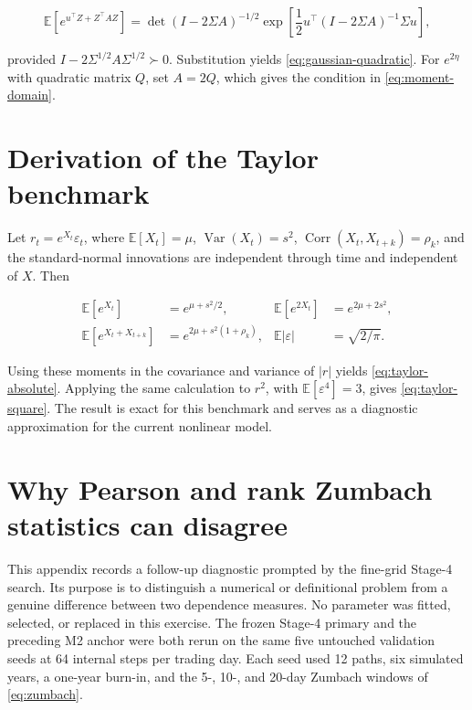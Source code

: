 \documentclass[11pt,a4paper]{article}
\newcommand{\E}{\mathbb{E}}
\newcommand{\Var}{\operatorname{Var}}
\newcommand{\Corr}{\operatorname{Corr}}
\begin{document}
\begin{equation}
\E\!\left[e^{u^\top Z+Z^\top AZ}\right]
=\det(I-2\Sigma A)^{-1/2}
\exp\!\left[
\frac12u^\top(I-2\Sigma A)^{-1}\Sigma u
\right],
\end{equation}

provided \(I-2\Sigma^{1/2}A\Sigma^{1/2}\succ0\). Substitution yields
\cref{eq:gaussian-quadratic}. For \(e^{2\eta}\) with quadratic matrix \(Q\), set
\(A=2Q\), which gives the condition in \cref{eq:moment-domain}.

\section{Derivation of the Taylor benchmark}

Let \(r_t=e^{X_t}\varepsilon_t\), where
\(\E[X_t]=\mu\), \(\Var(X_t)=s^2\),
\(\Corr(X_t,X_{t+k})=\rho_k\), and the standard-normal innovations are independent through
time and independent of \(X\). Then

\begin{align}
\E[e^{X_t}]&=e^{\mu+s^2/2}, &
\E[e^{2X_t}]&=e^{2\mu+2s^2},\\
\E[e^{X_t+X_{t+k}}]&=e^{2\mu+s^2(1+\rho_k)}, &
\E|\varepsilon|&=\sqrt{2/\pi}.
\end{align}

Using these moments in the covariance and variance of \(|r|\) yields
\cref{eq:taylor-absolute}. Applying the same calculation to \(r^2\), with
\(\E[\varepsilon^4]=3\), gives \cref{eq:taylor-square}. The result is exact for this benchmark
and serves as a diagnostic approximation for the current nonlinear model.

\section{Why Pearson and rank Zumbach statistics can disagree}
\label{app:pearson-rank-zumbach}

This appendix records a follow-up diagnostic prompted by the fine-grid Stage-4 search. Its
purpose is to distinguish a numerical or definitional problem from a genuine difference between
two dependence measures. No parameter was fitted, selected, or replaced in this exercise. The
frozen Stage-4 primary and the preceding M2 anchor were both rerun on the same five untouched
validation seeds at 64 internal steps per trading day. Each seed used 12 paths, six simulated
years, a one-year burn-in, and the 5-, 10-, and 20-day Zumbach windows of
\cref{eq:zumbach}.
\end{document}
